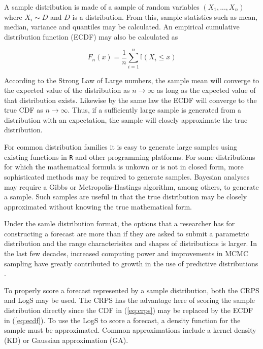 \documentclass[11pt,notitlepage]{isuthesis}
\begin{document}
A sample distribution is made of a sample of random variables 
$(X_1,...,X_n)$ where $X_i \sim D$ and $D$ is a distribution. From this, sample
statistics such as mean, median, variance and quantiles may be calculated. 
An empirical cumulative distribution function (ECDF) may also be calculated as

\begin{equation}
\label{eq:ecdf}
  F_n(x) = \frac{1}{n} \sum_{i=1}^n \mathbb{I}(X_i \leq x)
\end{equation}

According to the Strong Law of Large numbers, the sample mean will converge to
the expected value of the distribution as $n \rightarrow \infty$ as long as the 
expected value of that distribution exists. Likewise by the same law the 
ECDF will converge to the true CDF 
as $n \rightarrow \infty$. Thus, if a sufficiently large 
sample is generated from a distribution with an expectation, 
the sample will closely approximate the 
true distribution. 

For common distribution families it is easy to generate large samples using 
existing functions in \texttt{R} and other programming platforms. For some 
distributions 
for which the mathematical formula is unkown or is not in closed form, more 
sophisticated methods may be required to generate samples. Bayesian analyses may 
require a Gibbs or Metropolis-Hastings algorithm, among others, to generate a 
sample. Such samples are useful in that the true distribution may be closely 
approximated without knowing the true mathematical form. 

Under the samle distribution format, the options that a researcher has for 
constructing a forecast are more than
if they are asked to submit a parametric distribution and the range 
characterisitcs 
and shapes of distributions is larger.
In the last few decades, increased computing power and improvements in MCMC
sampling have greatly contributed to growth in the use of
predictive distributions \cite{gneiting2007strictly}
\cite[see examples listed therein]{krueger2016probabilistic}.

To properly score a forecast represented by a sample distribution, both the CRPS
and LogS may be used. The CRPS has the advantage here of scoring the sample 
distribution directly since the CDF in  (\ref{eq:crps}) may be replaced by the 
ECDF in
(\ref{eq:ecdf}). To use the LogS to score a forecast, a density function for the 
sample must be approximated. Common approximations include a kernel density (KD)
or Gaussian approximation (GA).
\end{document}
